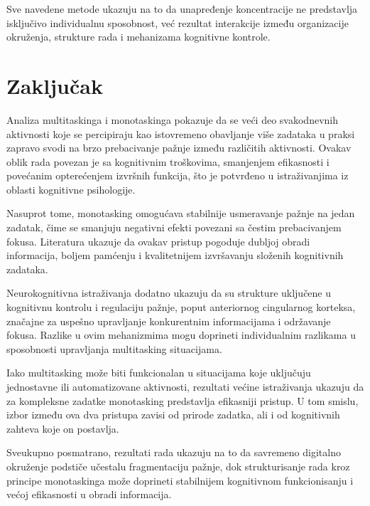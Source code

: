 \documentclass[12pt,a4paper]{article}
\begin{document}
Sve navedene metode ukazuju na to da unapređenje koncentracije ne predstavlja isključivo individualnu sposobnost, već rezultat interakcije između organizacije okruženja, strukture rada i mehanizama kognitivne kontrole.


\section{Zaključak}

Analiza multitaskinga i monotaskinga pokazuje da se veći deo svakodnevnih aktivnosti koje se percipiraju kao istovremeno obavljanje više zadataka u praksi zapravo svodi na brzo prebacivanje pažnje između različitih aktivnosti. Ovakav oblik rada povezan je sa kognitivnim troškovima, smanjenjem efikasnosti i povećanim opterećenjem izvršnih funkcija, što je potvrđeno u istraživanjima iz oblasti kognitivne psihologije.

Nasuprot tome, monotasking omogućava stabilnije usmeravanje pažnje na jedan zadatak, čime se smanjuju negativni efekti povezani sa čestim prebacivanjem fokusa. Literatura ukazuje da ovakav pristup pogoduje dubljoj obradi informacija, boljem pamćenju i kvalitetnijem izvršavanju složenih kognitivnih zadataka.

Neurokognitivna istraživanja dodatno ukazuju da su strukture uključene u kognitivnu kontrolu i regulaciju pažnje, poput anteriornog cingularnog korteksa, značajne za uspešno upravljanje konkurentnim informacijama i održavanje fokusa. Razlike u ovim mehanizmima mogu doprineti individualnim razlikama u sposobnosti upravljanja multitasking situacijama.

Iako multitasking može biti funkcionalan u situacijama koje uključuju jednostavne ili automatizovane aktivnosti, rezultati većine istraživanja ukazuju da za kompleksne zadatke monotasking predstavlja efikasniji pristup. U tom smislu, izbor između ova dva pristupa zavisi od prirode zadatka, ali i od kognitivnih zahteva koje on postavlja.

Sveukupno posmatrano, rezultati rada ukazuju na to da savremeno digitalno okruženje podstiče učestalu fragmentaciju pažnje, dok strukturisanje rada kroz principe monotaskinga može doprineti stabilnijem kognitivnom funkcionisanju i većoj efikasnosti u obradi informacija.

\newpage

\end{document}

